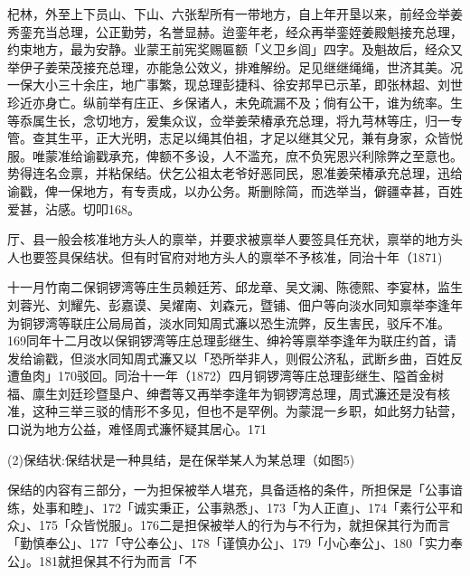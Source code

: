 \noindent 杞林，外至上下员山、下山、六张犁所有一带地方，自上年开垦以来，前经佥举姜秀銮充当总理，公正勤劳，名誉显赫。迨銮年老，经众再举銮姪姜殿魁接充总理，约束地方，最为安静。业蒙王前宪奖赐匾额「义卫乡闾」四字。及魁故后，经众又举伊子姜荣茂接充总理，亦能急公效义，排难解纷。足见继继绳绳，世济其美。况一保大小三十余庄，地广事繁，现总理彭捷科、徐安邦早已示革，即张林超、刘世珍近亦身亡。纵前举有庄正、乡保诸人，未免疏漏不及；倘有公干，谁为统率。生等忝属生长，念切地方，爰集众议，佥举姜荣椿承充总理，将九芎林等庄，归一专管。查其生平，正大光明，志足以绳其伯祖，才足以继其父兄，兼有身家，众皆悦服。唯蒙准给谕戳承充，俾额不多设，人不滥充，庶不负宪恩兴利除弊之至意也。势得连名佥禀，并粘保结。伏乞公祖太老爷好恶同民，恩准姜荣椿承充总理，迅给谕戳，俾一保地方，有专责成，以办公务。斯删除简，而选举当，僻疆幸甚，百姓爱甚，沾感。切叩168。

厅、县一般会核准地方头人的禀举，并要求被禀举人要签具任充状，禀举的地方头人也要签具保结状。但有时官府对地方头人的禀举不予核准，同治十年（1871)

\vfill
\begin{BookNotes}
\end{BookNotes}


\noindent 十一月竹南二保铜锣湾等庄生员赖廷芳、邱龙章、吴文澜、陈德熙、李宴林，监生刘蓉光、刘耀先、彭嘉谟、吴燿南、刘森元，暨铺、佃户等向淡水同知禀举李逢年为铜锣湾等联庄公局局首，淡水同知周式濂以恐生流弊，反生害民，驳斥不准。169同年十二月改以保铜锣湾等庄总理彭继生、绅衿等禀举李逢年为联庄约首，请发给谕戳，但淡水同知周式濂又以「恐所举非人，则假公济私，武断乡曲，百姓反遭鱼肉」170驳回。同治十一年（1872）四月铜锣湾等庄总理彭继生、隘首金树福、廪生刘廷珍暨垦户、绅耆等又再举李逢年为铜锣湾总理，周式濂还是没有核准，这种三举三驳的情形不多见，但也不是罕例。为蒙混一乡职，如此努力钻营，口说为地方公益，难怪周式濂怀疑其居心。171

(2)保结状:保结状是一种具结，是在保举某人为某总理（如图5)

\begin{BookQuote}
保结的内容有三部分，一为担保被举人堪充，具备适格的条件，所担保是「公事谙练，处事和睦」、172「诚实秉正，公事熟悉」、173「为人正直」、174「素行公平和众」、175「众皆悦服」。176二是担保被举人的行为与不行为，就担保其行为而言「勤慎奉公」、177「守公奉公」、178「谨慎办公」、179「小心奉公」、180「实力奉公」。181就担保其不行为而言「不
\end{BookQuote}

